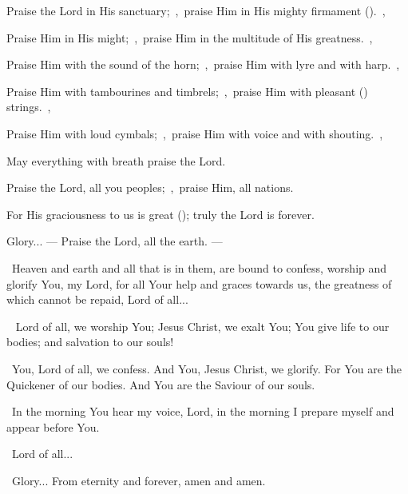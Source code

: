 \documentclass[12pt,twoside,a5paper]{article}
\begin{document}
\begin{halfparskip}
   Praise the Lord in His sanctuary;~\sep\ praise Him in His mighty firmament ().~\sep

  Praise Him in His might;~\sep\ praise Him in the multitude of His greatness.~\sep

  Praise Him with the sound of the horn;~\sep\ praise Him with lyre and with harp.~\sep

  Praise Him with tambourines and timbrels;~\sep\ praise Him with pleasant () strings.~\sep

  Praise Him with loud cymbals;~\sep\ praise Him with voice and with shouting.~\sep

  May everything with breath praise the Lord.

   Praise the Lord, all you peoples;~\sep\ praise Him, all nations.

  For His graciousness to us is great (); truly the Lord is forever.

  Glory... --- Praise the Lord, all the earth. --- 
\end{halfparskip}


\cc~Heaven and earth and all that is in them, are bound to confess, worship and glorify You, my Lord, for all Your help and graces towards us, the greatness of which cannot be repaid, Lord of all...



\begin{doublecols}
  \englishl \rr~ Lord of all, we worship You; Jesus Christ, we exalt You; You give life to our bodies; and salvation to our souls!

   \rr~You, Lord of all, we confess. And You, Jesus Christ, we glorify. For You are the Quickener of our bodies. And You are the Saviour of our souls.
\end{doublecols}

\dd~In the morning You hear my voice, Lord, in the morning I prepare myself and appear before You.

\rr~Lord of all...

\cc~Glory... From eternity and forever, amen and amen.
\end{document}
